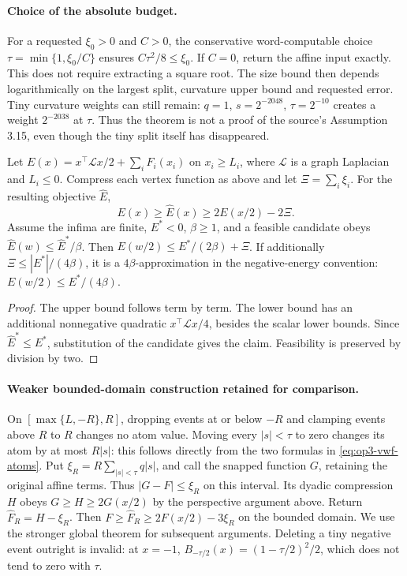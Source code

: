 \paragraph{Choice of the absolute budget.}
For a requested $\xi_0>0$ and $C>0$, the conservative word-computable choice
$\tau=\min\{1,\xi_0/C\}$ ensures $C\tau^2/8\leq\xi_0$.
If $C=0$, return the affine input exactly. This does not require extracting
a square root. The size bound then depends logarithmically on the largest
split, curvature upper bound and requested error. Tiny curvature weights
can still remain: $q=1$, $s=2^{-2048}$, $\tau=2^{-10}$ creates a weight
$2^{-2038}$ at $\tau$. Thus the theorem is not a proof of the source's
Assumption 3.15, even though the tiny split itself has disappeared.

\begin{corollary}
\label{cor:op3-global-vwf-energy-embedding}
Let $E(x)=x^\top\mathcal Lx/2+\sum_iF_i(x_i)$ on
$x_i\geq L_i$, where $\mathcal L$ is a graph Laplacian and $L_i\leq0$.
Compress each vertex function as above and let $\Xi=\sum_i\xi_i$.
For the resulting objective $\widehat E$,
\[
 E(x)\geq\widehat E(x)\geq2E(x/2)-2\Xi.
\]
Assume the infima are finite, $E^*<0$, $\beta\geq1$, and a feasible
candidate obeys $\widehat E(w)\leq\widehat E^*/\beta$.
Then $E(w/2)\leq E^*/(2\beta)+\Xi$.
If additionally $\Xi\leq|E^*|/(4\beta)$, it is a $4\beta$-approximation
in the negative-energy convention: $E(w/2)\leq E^*/(4\beta)$.
\end{corollary}
\begin{proof}
The upper bound follows term by term. The lower bound has an additional
nonnegative quadratic $x^\top\mathcal Lx/4$, besides the scalar lower
bounds. Since $\widehat E^*\leq E^*$, substitution of the candidate gives
the claim. Feasibility is preserved by division by two.
\end{proof}

\paragraph{Weaker bounded-domain construction retained for comparison.}
On $[\max\{L,-R\},R]$, dropping events at or below $-R$ and clamping
events above $R$ to $R$ changes no atom value. Moving every $|s|<\tau$
to zero changes its atom by at most $R|s|$: this follows directly from
the two formulas in \eqref{eq:op3-vwf-atoms}. Put
$\xi_R=R\sum_{|s|<\tau}q|s|$, and call the snapped function $G$, retaining
the original affine terms. Thus $|G-F|\leq\xi_R$ on this interval.
Its dyadic compression $H$ obeys $G\geq H\geq2G(x/2)$ by the perspective
argument above. Return $\widehat F_R=H-\xi_R$. Then
$F\geq\widehat F_R\geq2F(x/2)-3\xi_R$ on the bounded domain.
We use the stronger global theorem for subsequent arguments.
Deleting a tiny negative event outright is invalid: at $x=-1$,
$B_{-\tau/2}(x)=(1-\tau/2)^2/2$, which does not tend to zero with $\tau$.

